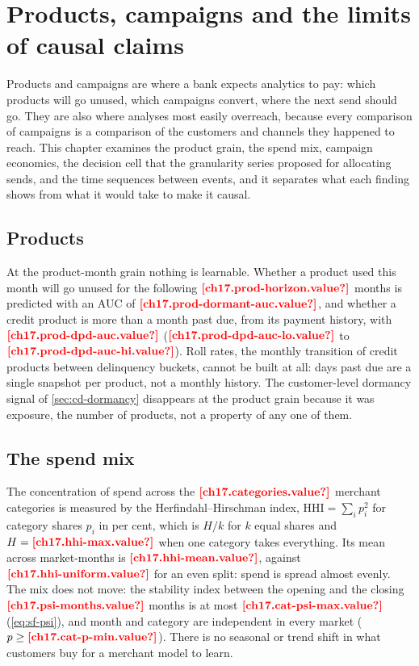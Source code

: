 \chapter{Products, campaigns and the limits of causal claims}\label{ch:products-and-campaigns}

Products and campaigns are where a bank expects analytics to pay: which products will go unused, which campaigns convert,
where the next send should go. They are also where analyses most easily overreach, because every comparison of campaigns is
a comparison of the customers and channels they happened to reach. This chapter examines the product grain, the spend mix,
campaign economics, the decision cell that the granularity series proposed for allocating sends, and the time sequences
between events, and it separates what each finding shows from what it would take to make it causal.

\section{Products}\label{sec:pc-products}

At the product-month grain nothing is learnable. Whether a product used this month will go unused for the following $\est{ch17.prod-horizon}{value}$ months is
predicted with an AUC of $\est{ch17.prod-dormant-auc}{value}$, and whether a credit product is more than a month past due,
from its payment history, with $\est{ch17.prod-dpd-auc}{value}$ ($\est{ch17.prod-dpd-auc-lo}{value}$ to
$\est{ch17.prod-dpd-auc-hi}{value}$). Roll rates, the monthly transition of credit products between delinquency buckets,
cannot be built at all: days past due are a single snapshot per product, not a monthly history. The customer-level dormancy
signal of \cref{sec:cd-dormancy} disappears at the product grain because it was exposure, the number of products, not a
property of any one of them.

\section{The spend mix}\label{sec:pc-mix}

The concentration of spend across the $\est{ch17.categories}{value}$ merchant categories is measured by the
Herfindahl--Hirschman index, $\mathrm{HHI} = \sum_i p_i^2$ for category shares $p_i$ in per cent, which is $H / k$ for $k$ equal shares and $H = \est{ch17.hhi-max}{value}$ when one category takes everything. Its mean across market-months is
$\est{ch17.hhi-mean}{value}$, against $\est{ch17.hhi-uniform}{value}$ for an even split: spend is spread almost evenly. The mix
does not move: the stability index between the opening and the closing $\est{ch17.psi-months}{value}$ months is at most $\est{ch17.cat-psi-max}{value}$
(\cref{eq:sf-psi}), and month and category are independent in every market ($p \ge \est{ch17.cat-p-min}{value}$). There is no
seasonal or trend shift in what customers buy for a merchant model to learn.

